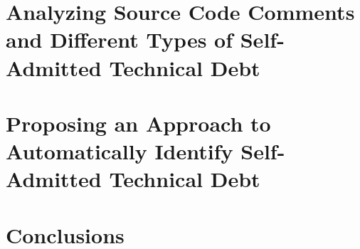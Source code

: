 \documentclass{report}
\begin{document}
\chapter{Analyzing Source Code Comments and Different Types of Self-Admitted Technical Debt}
\label{chapter3}


\chapter{Proposing an Approach to Automatically Identify Self-Admitted Technical Debt}
\label{chapter4}


\chapter{Conclusions}
\label{conclusion}



  

\end{document}
